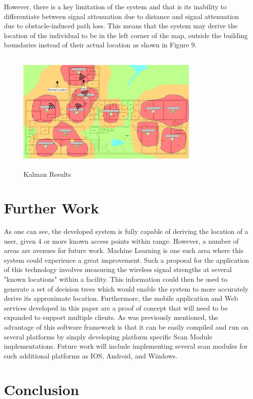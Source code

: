 \documentclass[conference]{IEEEtran}
\begin{document}
However, there is a key limitation of the system and that is its inability to differentiate between signal attenuation due to distance and signal attenuation due to obstacle-induced path loss. This means that the system may derive the location of the individual to be in the left corner of the map, outside the building boundaries instead of their actual location as shown in Figure 9.
\begin{figure}[H]
    \includegraphics[width=9.0cm,height=6cm]{Geolocation_3.jpeg}
    \caption{Kalman Results}
    \end{figure}

\section{Further Work}
As one can see, the developed system is fully capable of deriving the location of a user, given 4 or more known access points within range. However, a number of areas are avenues for future work. Machine Learning is one such area where this system could experience a great improvement. Such a proposal for the application of this technology involves measuring the wireless signal strengths at several "known locations" within a facility. This information could then be used to generate a set of decision trees which would enable the system to more accurately derive its approximate location. Furthermore, the mobile application and Web services developed in this paper are a proof of concept that will need to be expanded to support multiple clients. As was previously mentioned, the advantage of this software framework is that it can be easily compiled and run on several platforms by simply developing platform specific Scan Module implementations. Future work will include implementing several scan modules for such additional platforms as IOS, Android, and Windows.

\section{Conclusion}
\end{document}
